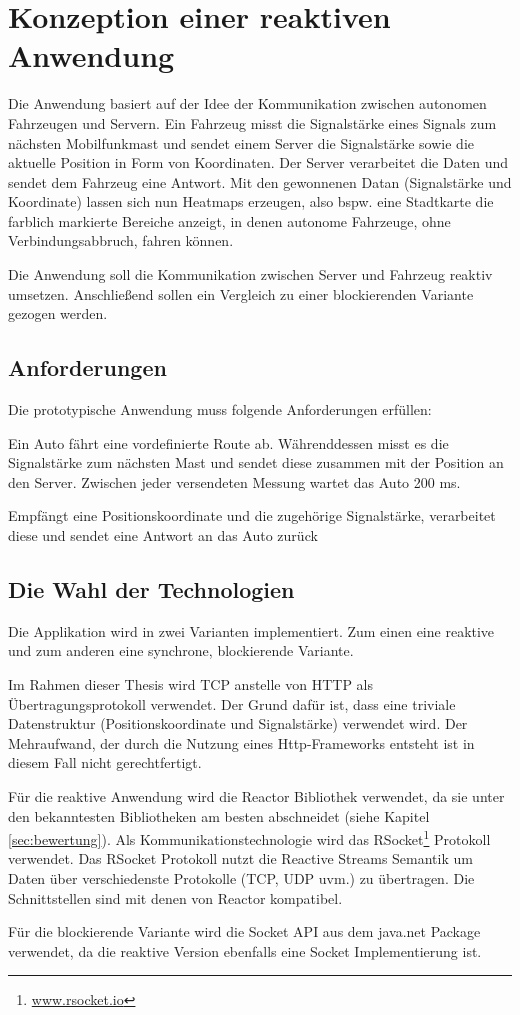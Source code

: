 \chapter{Konzeption einer reaktiven Anwendung}
\label{chap:concept}
Die Anwendung basiert auf der Idee der Kommunikation zwischen autonomen Fahrzeugen und Servern. Ein Fahrzeug misst die Signalstärke eines Signals zum nächsten Mobilfunkmast und sendet einem Server die Signalstärke sowie die aktuelle Position in Form von Koordinaten. Der Server verarbeitet die Daten und sendet dem Fahrzeug eine Antwort. Mit den gewonnenen Datan (Signalstärke und Koordinate) lassen sich nun Heatmaps erzeugen, also bspw. eine  Stadtkarte die farblich markierte Bereiche anzeigt, in denen autonome Fahrzeuge, ohne Verbindungsabbruch, fahren können. 

Die Anwendung soll die Kommunikation zwischen Server und Fahrzeug reaktiv umsetzen. Anschließend sollen ein Vergleich zu einer blockierenden Variante gezogen werden.

\section{Anforderungen}
Die prototypische Anwendung muss folgende Anforderungen erfüllen:
\begin{description}
\label{anforderungen}
\item [Client: ] Ein Auto fährt eine vordefinierte Route ab. Währenddessen misst es die Signalstärke zum nächsten Mast und sendet diese zusammen mit der Position an den Server. Zwischen jeder versendeten Messung wartet das Auto 200 ms.
\item [Server: ] Empfängt eine Positionskoordinate und die zugehörige Signalstärke, verarbeitet diese und sendet eine Antwort an das Auto zurück
\end{description}

\section{Die Wahl der Technologien}
Die Applikation wird in zwei Varianten implementiert. Zum einen eine reaktive und zum anderen eine synchrone, blockierende Variante.

Im Rahmen dieser Thesis wird TCP anstelle von HTTP als Übertragungsprotokoll verwendet. Der Grund dafür ist, dass eine triviale Datenstruktur (Positionskoordinate und Signalstärke) verwendet wird. Der Mehraufwand, der durch die Nutzung eines Http-Frameworks entsteht ist in diesem Fall nicht gerechtfertigt.

Für die reaktive Anwendung wird die Reactor Bibliothek verwendet, da sie unter den bekanntesten Bibliotheken am besten abschneidet (siehe Kapitel \ref{sec:bewertung}). Als Kommunikationstechnologie wird das RSocket\footnote{\href{www.rsocket.io}{www.rsocket.io}} Protokoll verwendet. Das RSocket Protokoll nutzt die Reactive Streams Semantik um Daten über verschiedenste Protokolle (TCP, UDP uvm.) zu übertragen. Die Schnittstellen sind mit denen von Reactor kompatibel.

Für die blockierende Variante wird die Socket API aus dem java.net Package verwendet, da die reaktive Version ebenfalls eine Socket Implementierung ist. 

